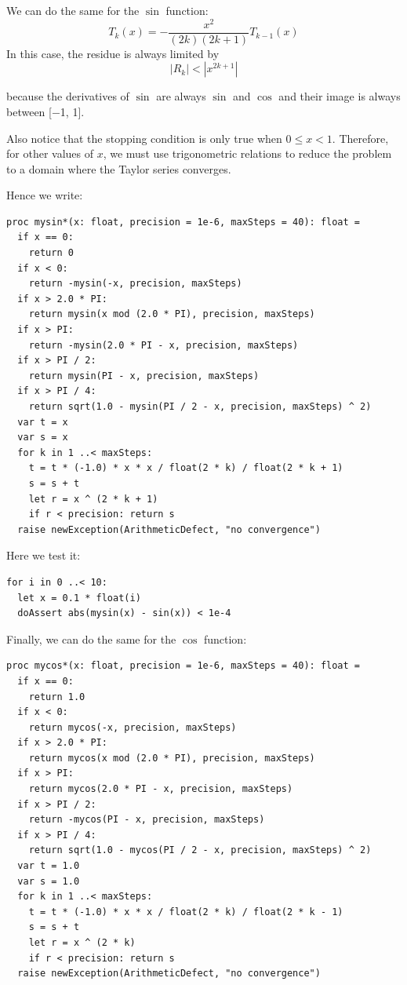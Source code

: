 \documentclass[justified, sixbynine]{tufte-book}
\def\ft{\small\tt}
\theoremstyle{plain}%
\newtheorem * {corollary}{Corollary}
\theoremstyle{definition}
\theoremstyle{remark}
\newtheorem * {remark}{Remark}
\newtheorem * {note}{Note}
\begin{document}
\begin{fullwidth}
We can do the same for the $\sin$ function:
\begin{equation}
T_k(x) = -\frac{x^2}{(2k)(2k+1)}T_{k-1}(x)
\end{equation}
In this case, the residue is always limited by
\begin{equation}
|R_k| < |x^{2k+1}|
\end{equation}

because the derivatives of $\sin$ are always $\sin$ and $\cos$ and their image is always between [$-$1, 1].

Also notice that the stopping condition is only true when $0\leq x<1$. Therefore, for other values of $x$, we must use trigonometric relations to reduce the problem to a domain where the Taylor series converges.

Hence we write:

\begin{lstlisting}[caption={in file: {\ft nlib/taylor.nim}}]
proc mysin*(x: float, precision = 1e-6, maxSteps = 40): float =
  if x == 0:
    return 0
  if x < 0:
    return -mysin(-x, precision, maxSteps)
  if x > 2.0 * PI:
    return mysin(x mod (2.0 * PI), precision, maxSteps)
  if x > PI:
    return -mysin(2.0 * PI - x, precision, maxSteps)
  if x > PI / 2:
    return mysin(PI - x, precision, maxSteps)
  if x > PI / 4:
    return sqrt(1.0 - mysin(PI / 2 - x, precision, maxSteps) ^ 2)
  var t = x
  var s = x
  for k in 1 ..< maxSteps:
    t = t * (-1.0) * x * x / float(2 * k) / float(2 * k + 1)
    s = s + t
    let r = x ^ (2 * k + 1)
    if r < precision: return s
  raise newException(ArithmeticDefect, "no convergence")
\end{lstlisting}

Here we test it:
\begin{lstlisting}
for i in 0 ..< 10:
  let x = 0.1 * float(i)
  doAssert abs(mysin(x) - sin(x)) < 1e-4
\end{lstlisting}

Finally, we can do the same for the $\cos$ function:

\begin{lstlisting}[caption={in file: {\ft nlib/taylor.nim}}]
proc mycos*(x: float, precision = 1e-6, maxSteps = 40): float =
  if x == 0:
    return 1.0
  if x < 0:
    return mycos(-x, precision, maxSteps)
  if x > 2.0 * PI:
    return mycos(x mod (2.0 * PI), precision, maxSteps)
  if x > PI:
    return mycos(2.0 * PI - x, precision, maxSteps)
  if x > PI / 2:
    return -mycos(PI - x, precision, maxSteps)
  if x > PI / 4:
    return sqrt(1.0 - mycos(PI / 2 - x, precision, maxSteps) ^ 2)
  var t = 1.0
  var s = 1.0
  for k in 1 ..< maxSteps:
    t = t * (-1.0) * x * x / float(2 * k) / float(2 * k - 1)
    s = s + t
    let r = x ^ (2 * k)
    if r < precision: return s
  raise newException(ArithmeticDefect, "no convergence")
\end{lstlisting}


\end{fullwidth}
\end{document}
